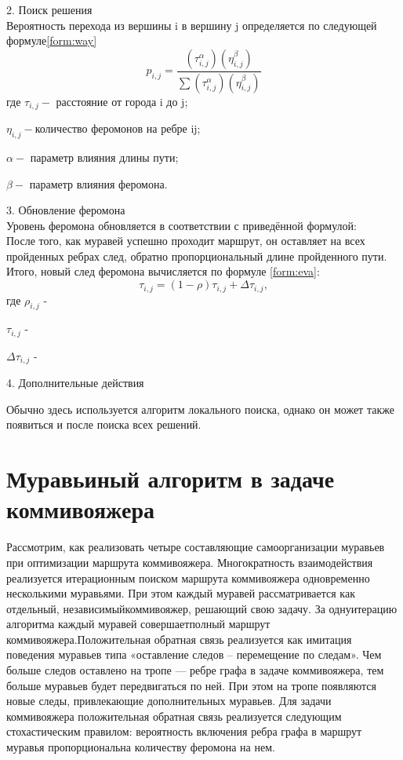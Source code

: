 \documentclass[12pt]{report}
\begin{document}
2. Поиск решения  \\
Вероятность перехода из вершины i в вершину j определяется по следующей формуле\ref{form:way}\\   
\begin{equation}\label{form:way} 
	p_{i,j}={\frac {(\tau _{i,j}^{\alpha })(\eta _{i,j}^{\beta })}{\sum (\tau _{i,j}^{\alpha })(\eta _{i,j}^{\beta })}}
\end{equation}
где \quad$ \tau _{i,j} - $ расстояние от города i до j;

$\eta _{i,j} - $количество феромонов на ребре ij;

$\alpha - $ параметр влияния длины пути;

$\beta - $ параметр влияния феромона.


3. Обновление феромона \\
Уровень феромона обновляется в соответствии с приведённой формулой:\\
После того, как муравей успешно проходит маршрут, он оставляет на всех пройденных ребрах след, обратно пропорциональный длине пройденного пути. Итого, новый след феромона вычисляется по формуле \ref{form:eva}:
\begin{equation}\label{form:eva} 
	\tau _{i,j}=(1-\rho )\tau _{i,j}+\Delta \tau _{i,j},
\end{equation}
где \quad$ \rho _{i,j}$ -  

$\tau _{i,j}$ -  

$\Delta \tau _{i,j}$ - 

4. Дополнительные действия 

Обычно здесь используется алгоритм локального поиска, однако    он может также появиться и после поиска всех решений. 

\section{Муравьиный алгоритм в задаче коммивояжера}
Рассмотрим, как реализовать четыре составляющие самоорганизации муравьев при оптимизации маршрута коммивояжера. Многократность взаимодействия реализуется итерационным поиском маршрута коммивояжера одновременно несколькими муравьями. При этом каждый муравей рассматривается как отдельный, независимыйкоммивояжер, решающий свою задачу. За однуитерацию алгоритма каждый муравей совершаетполный маршрут коммивояжера.Положительная обратная связь реализуется как имитация поведения муравьев типа «оставление следов – перемещение по следам». Чем больше следов оставлено на тропе — ребре графа в задаче коммивояжера, тем больше муравьев будет передвигаться по ней. При этом на тропе появляются новые следы, привлекающие дополнительных муравьев. Для задачи коммивояжера положительная обратная связь реализуется следующим стохастическим правилом: вероятность включения ребра графа в маршрут муравья пропорциональна количеству феромона на нем.
\end{document}
